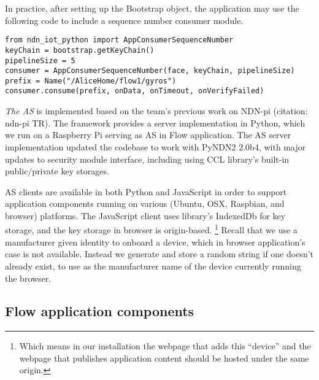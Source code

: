 In practice, after setting up the Bootstrap object, the application may use the following code to include a sequence number consumer module.

\begin{verbatim}
from ndn_iot_python import AppConsumerSequenceNumber
keyChain = bootstrap.getKeyChain()
pipelineSize = 5
consumer = AppConsumerSequenceNumber(face, keyChain, pipelineSize)
prefix = Name("/AliceHome/flow1/gyros")
consumer.consume(prefix, onData, onTimeout, onVerifyFailed)
\end{verbatim}

\emph{The AS} is implemented based on the team's previous work on NDN-pi (citation: ndn-pi TR).
The framework provides a server implementation in Python, which we run on a Raspberry Pi serving as AS in Flow application.
The AS server implementation updated the codebase to work with PyNDN2 2.0b4, with major updates to security module interface, including using CCL library's built-in public/private key storages.

AS clients are available in both Python and JavaScript in order to support application components running on various (Ubuntu, OSX, Raspbian, and browser) platforms.
The JavaScript client uses library's IndexedDb for key storage, and the key storage in browser is origin-based. \footnote{Which means in our installation the webpage that adds this ``device'' and the webpage that publishes application content should be hosted under the same origin.}
Recall that we use a manufacturer given identity to onboard a device, which in browser application's case is not available. 
Instead we generate and store a random string if one doesn't already exist, to use as the manufacturer name of the device currently running the browser.

\subsection{Flow application components}

